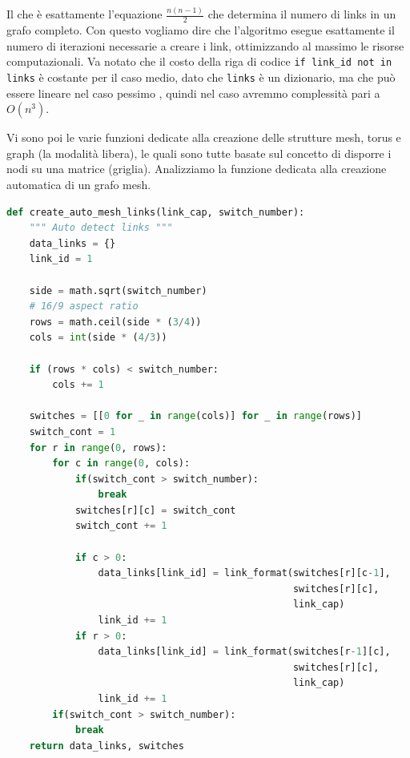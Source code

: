 \documentclass[binding=0.6cm]{sapthesis}
\begin{document}
Il che è esattamente l'equazione \(\frac{n(n-1)}{2}\) che determina il numero di links in un grafo completo. Con questo vogliamo dire che 
l'algoritmo esegue esattamente il numero di iterazioni necessarie a creare i link, ottimizzando al massimo le risorse computazionali. Va notato
che il costo della riga di codice \lstinline|if link_id not in links| è costante per il caso medio, dato che \texttt{links} è un dizionario, ma
che può essere lineare nel caso pessimo \cite{PythonWikiTimeComplexity}, quindi nel caso avremmo complessità pari a \(O(n^3)\).

Vi sono poi le varie funzioni dedicate alla creazione delle strutture mesh, torus e graph (la modalità libera), le quali sono tutte basate sul concetto di
disporre i nodi su una matrice (griglia).
Analizziamo la funzione dedicata alla creazione automatica di un grafo mesh.

{\scriptsize %
\begin{lstlisting}[language=Python, basicstyle=\ttfamily, caption={Funzione per la creazione automatica di un grafo mesh}, label={codice:create_auto_mesh_links}]
    def create_auto_mesh_links(link_cap, switch_number):
    """ Auto detect links """
    data_links = {}
    link_id = 1

    side = math.sqrt(switch_number)
    # 16/9 aspect ratio
    rows = math.ceil(side * (3/4))
    cols = int(side * (4/3))

    if (rows * cols) < switch_number:
        cols += 1

    switches = [[0 for _ in range(cols)] for _ in range(rows)]
    switch_cont = 1
    for r in range(0, rows):
        for c in range(0, cols):
            if(switch_cont > switch_number):
                break
            switches[r][c] = switch_cont
            switch_cont += 1

            if c > 0:
                data_links[link_id] = link_format(switches[r][c-1], 
                                                  switches[r][c], 
                                                  link_cap)
                link_id += 1
            if r > 0:
                data_links[link_id] = link_format(switches[r-1][c], 
                                                  switches[r][c], 
                                                  link_cap)
                link_id += 1
        if(switch_cont > switch_number):
            break
    return data_links, switches
\end{lstlisting}
} %
\end{document}
